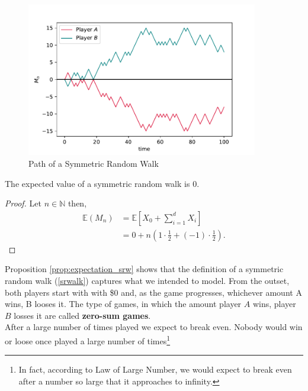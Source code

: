 \documentclass[../TGMAFFIRO]{subfiles}
\begin{document}
\begin{figure}
	\label{fig:symmetric_random_walk}
	\centering
	\includegraphics[width=0.9\textwidth]{images/symmetric_random_walk}
	\caption{Path of a Symmetric Random Walk}
\end{figure}

\begin{proposition}\label{prop:expectation_srw}
	The expected value of a symmetric random walk is 0.
\end{proposition}

\begin{proof}
	Let $n \in \mathbb{N}$ then,
	\begin{align*}
	\mathbb{E}(M_n) &= \mathbb{E}\left[X_0 + \sum_{i=1}^d X_i\right]\\
				    &= 0 + n  \left( 1 \cdot \frac{1}{2} + (-1) \cdot \frac{1}{2}\right).
	\end{align*}
\end{proof}

Proposition \ref{prop:expectation_srw} shows that the definition of a symmetric random walk (\ref{srwalk}) captures what we intended to model. From the outset, both players start with with \$0 and, as the game progresses, whichever amount A wins, B looses it. The type of games, in which the amount player $A$ wins, player $B$ losses it are called \textbf{zero-sum games}.\\

After a large number of times played we expect to break even. Nobody would win or loose once played a large number of times\footnote{In fact, according to Law of Large Number, we would expect to break even after a number so large that it approaches to infinity.}\\
\end{document}
